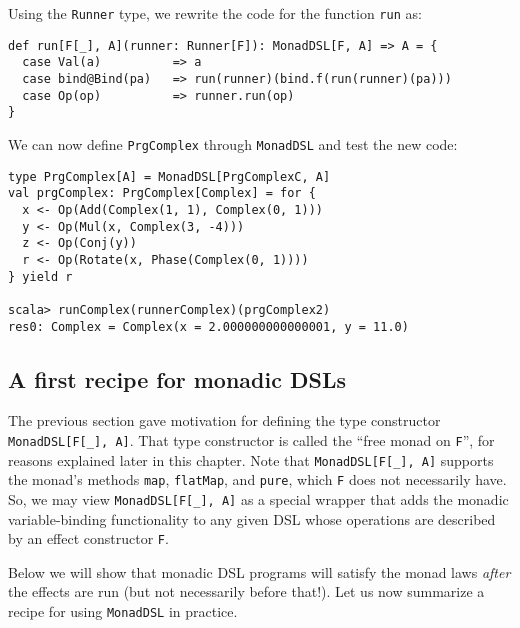 Using the \lstinline!Runner!
type, we rewrite the code for the function \lstinline!run!
as:
\begin{lstlisting}
def run[F[_], A](runner: Runner[F]): MonadDSL[F, A] => A = {
  case Val(a)          => a
  case bind@Bind(pa)   => run(runner)(bind.f(run(runner)(pa)))
  case Op(op)          => runner.run(op)
}
\end{lstlisting}
We can now define \lstinline!PrgComplex!
through \lstinline!MonadDSL!
and test the new code:
\begin{lstlisting}
type PrgComplex[A] = MonadDSL[PrgComplexC, A]
val prgComplex: PrgComplex[Complex] = for {
  x <- Op(Add(Complex(1, 1), Complex(0, 1)))
  y <- Op(Mul(x, Complex(3, -4)))
  z <- Op(Conj(y))
  r <- Op(Rotate(x, Phase(Complex(0, 1))))
} yield r

scala> runComplex(runnerComplex)(prgComplex2)
res0: Complex = Complex(x = 2.000000000000001, y = 11.0)
\end{lstlisting}

\subsection{A first recipe for monadic DSLs}

The previous section gave motivation for defining the type constructor
\lstinline!MonadDSL[F[_], A]!.
That type constructor is called the \textsf{``}free monad on \lstinline!F!\textsf{''},
for reasons explained later in this chapter. Note that \lstinline!MonadDSL[F[_], A]!
supports the monad\textsf{'}s methods \lstinline!map!,
\lstinline!flatMap!, and
\lstinline!pure!, which
\lstinline!F! does not
necessarily have. So, we may view \lstinline!MonadDSL[F[_], A]!
as a special wrapper that adds the monadic variable-binding functionality
to any given DSL whose operations are described by an effect constructor
\lstinline!F!.

Below we will show that monadic DSL programs will satisfy the monad
laws \emph{after} the effects are run (but not necessarily before
that!). Let us now summarize a recipe for using \lstinline!MonadDSL!
in practice.

